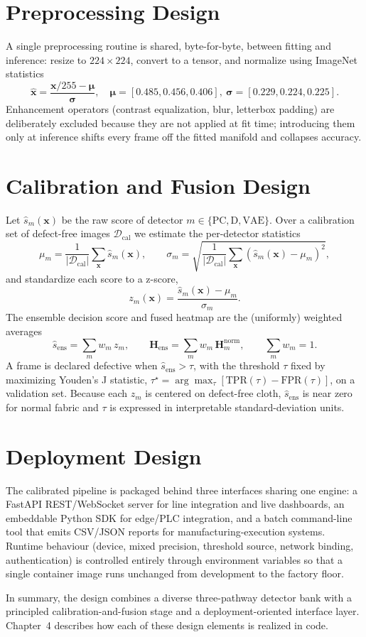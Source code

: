 \section{Preprocessing Design}

A single preprocessing routine is shared, byte-for-byte, between fitting and inference: resize to $224\times224$, convert to a tensor, and normalize using ImageNet statistics
\[
\hat{\mathbf{x}} = \frac{\mathbf{x}/255 - \boldsymbol{\mu}}{\boldsymbol{\sigma}}, \quad
\boldsymbol{\mu} = [0.485,0.456,0.406],\ \boldsymbol{\sigma} = [0.229,0.224,0.225].
\]
Enhancement operators (contrast equalization, blur, letterbox padding) are deliberately excluded because they are not applied at fit time; introducing them only at inference shifts every frame off the fitted manifold and collapses accuracy.

\section{Calibration and Fusion Design}

Let $\hat{s}_m(\mathbf{x})$ be the raw score of detector $m\in\{\text{PC},\text{D},\text{VAE}\}$. Over a calibration set of defect-free images $\mathcal{D}_{\text{cal}}$ we estimate the per-detector statistics
\[
\mu_m = \frac{1}{|\mathcal{D}_{\text{cal}}|}\sum_{\mathbf{x}} \hat{s}_m(\mathbf{x}), \qquad
\sigma_m = \sqrt{\frac{1}{|\mathcal{D}_{\text{cal}}|}\sum_{\mathbf{x}} (\hat{s}_m(\mathbf{x})-\mu_m)^2},
\]
and standardize each score to a z-score,
\[
z_m(\mathbf{x}) = \frac{\hat{s}_m(\mathbf{x}) - \mu_m}{\sigma_m}.
\]
The ensemble decision score and fused heatmap are the (uniformly) weighted averages
\[
\hat{s}_{\text{ens}} = \sum_m w_m\, z_m, \qquad
\mathbf{H}_{\text{ens}} = \sum_m w_m\, \mathbf{H}^{\text{norm}}_m, \qquad \sum_m w_m = 1.
\]
A frame is declared defective when $\hat{s}_{\text{ens}} > \tau$, with the threshold $\tau$ fixed by maximizing Youden's J statistic, $\tau^\star = \arg\max_\tau [\text{TPR}(\tau) - \text{FPR}(\tau)]$, on a validation set. Because each $z_m$ is centered on defect-free cloth, $\hat{s}_{\text{ens}}$ is near zero for normal fabric and $\tau$ is expressed in interpretable standard-deviation units.

\section{Deployment Design}

The calibrated pipeline is packaged behind three interfaces sharing one engine: a FastAPI REST/WebSocket server for line integration and live dashboards, an embeddable Python SDK for edge/PLC integration, and a batch command-line tool that emits CSV/JSON reports for manufacturing-execution systems. Runtime behaviour (device, mixed precision, threshold source, network binding, authentication) is controlled entirely through environment variables so that a single container image runs unchanged from development to the factory floor.

In summary, the design combines a diverse three-pathway detector bank with a principled calibration-and-fusion stage and a deployment-oriented interface layer. Chapter~4 describes how each of these design elements is realized in code.
